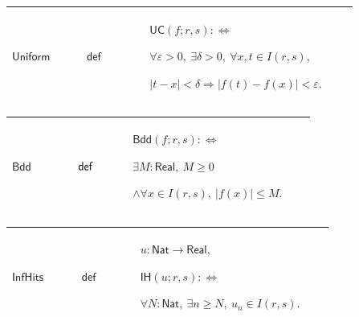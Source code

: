 \documentclass[12pt,reqno]{amsart}
\theoremstyle{blueplain}
\numberwithin{equation}{section}
\begin{document}
{\scriptsize \setlength{\parskip}{0pt}\nointerlineskip
\noindent 
\begin{tabular}{|@{}>{\centering\arraybackslash}m{0.19251\linewidth}|>{\centering\arraybackslash}m{0.16845\linewidth}|>{\centering\arraybackslash}m{0.53904\linewidth}|}
\hline
\hypertarget{def:Uniform}{$\displaystyle \mathsf{Uniform}$} & $\displaystyle 
\mathsf{def}$ & $\displaystyle \mathsf{UC}(f;r,s):\Longleftrightarrow$\par$%
\displaystyle \forall\varepsilon>0,\ \exists\delta>0,\ \forall x,t\in
I(r,s), $\par$\displaystyle |t-x|<\delta\Rightarrow|f(t)-f(x)|<\varepsilon.$
\\ \hline
\end{tabular}%
}

{\scriptsize \setlength{\parskip}{0pt}\nointerlineskip
\noindent 
\begin{tabular}{|@{}>{\centering\arraybackslash}m{0.19251\linewidth}|>{\centering\arraybackslash}m{0.16845\linewidth}|>{\centering\arraybackslash}m{0.53904\linewidth}|}
\hline
\hypertarget{def:Bdd}{$\displaystyle \mathsf{Bdd}$} & $\displaystyle \mathsf{%
def}$ & $\displaystyle \mathsf{Bdd}(f;r,s):\Longleftrightarrow$\par$%
\displaystyle \exists M:\mathsf{Real},\ M\ge0$\par$\displaystyle %
\land\forall x\in I(r,s),\ |f(x)|\le M.$ \\ \hline
\end{tabular}%
}

{\scriptsize \setlength{\parskip}{0pt}\nointerlineskip
\noindent 
\begin{tabular}{|@{}>{\centering\arraybackslash}m{0.19251\linewidth}|>{\centering\arraybackslash}m{0.16845\linewidth}|>{\centering\arraybackslash}m{0.53904\linewidth}|}
\hline
\hypertarget{def:InfHits}{$\displaystyle \mathsf{InfHits}$} & $\displaystyle 
\mathsf{def}$ & $\displaystyle u:\mathsf{Nat}\to\mathsf{Real},$\par$%
\displaystyle \mathsf{IH}(u;r,s):\Longleftrightarrow$\par$\displaystyle %
\forall N:\mathsf{Nat},\ \exists n\ge N,\ u_n\in I(r,s).$ \\ \hline
\end{tabular}%
}
\end{document}
